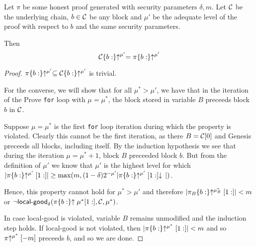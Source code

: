 \begin{lemma}\label{lem.allblocks}
Let $\pi$ be some honest proof generated with security parameters $\delta, m$.
Let $\mathcal{C}$ be the underlying chain, $b \in \mathcal{C}$ be any block and $\mu'$ be
the adequate level of the proof with respect to $b$ and the same security
parameters.

Then
\begin{equation*}
\mathcal{C}\{b:\}\negthickspace\uparrow^{\mu'} = \pi\{b:\}\negthickspace\uparrow^{\mu'}
\end{equation*}
\end{lemma}
\begin{proof}
    $\pi\{b:\}\negthickspace\uparrow^{\mu'} \subseteq \mathcal{C}\{b:\}\negthickspace\uparrow^{\mu'}$ is trivial.

    For the converse, we will show that for all $\mu^* > \mu'$, we have that in
    the iteration of the Prove \texttt{for} loop with $\mu = \mu^*$, the block
    stored in variable $B$ preceeds block $b$ in $\mathcal{C}$.

    Suppose $\mu = \mu^*$ is the first \texttt{for} loop iteration during which the
    property is violated. Clearly this cannot be the first iteration, as there
    $B = \mathcal{C}[0]$ and Genesis preceeds all blocks, including itself. By the
    induction hypothesis we see that during the iteration $\mu = \mu^* + 1$,
    block $B$ preceeded block $b$. But from the definition of $\mu'$ we know
    that $\mu'$ is the highest level for which
    $|\pi\{b:\}\negthickspace\uparrow^{\mu'}[1:]|
    \geq \max(m, (1 -
    \delta)2^{-\mu'}|\pi\{b:\}\negthickspace\uparrow^{\mu'}[1:]\negthickspace\downarrow\,|)$.

    Hence, this
    property cannot hold for $\mu^* > \mu'$ and therefore
    $|\pi_B\{b:\}\negthickspace\uparrow^{\mu_B^*}[1:]| < m$ or $\lnot
    \textsf{local-good}_\delta(\pi\{b:\}\negthickspace\uparrow{\mu^*}[1:], \mathcal{C}, \mu^*)$.

    In case \textsf{local-good} is violated, variable $B$ remains unmodified and
    the induction step holds. If \textsf{local-good} is not violated, then
    $|\pi\{b:\}\negthickspace\uparrow^{\mu^*}[1:]| < m$ and so $\pi\negthickspace\uparrow^{\mu^*}[-m]$
    preceeds $b$, and so we are done.
    \Qed
\end{proof}



